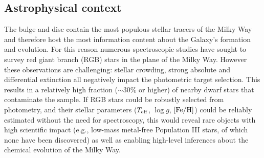 \documentclass[a4paper]{article}
\begin{document}
%
%
\begin{ObservingProgram}
%
%
%
%
%
%
%
\subsection*{Astrophysical context}

The bulge and disc contain the most populous stellar tracers of the Milky Way and therefore host the most information content about the Galaxy's formation and evolution.  For this reason numerous spectroscopic studies have sought to survey red giant branch (RGB) stars in the plane of the Milky Way.  However these observations are challenging: stellar crowding, strong absolute and differential extinction all negatively impact the photometric target selection.  This results in a relatively high fraction ($\sim$30\% or higher) of nearby dwarf stars that contaminate the sample.  If RGB stars could be robustly selected from photometry, and their stellar parameters ($T_{\rm eff}$, $\log{g}$, ${\rm [Fe/H]}$) could be reliably estimated without the need for spectroscopy, this would reveal rare objects with high scientific impact (e.g., low-mass metal-free Population III stars, of which none have been discovered) as well as enabling high-level inferences about the chemical evolution of the Milky Way.



\end{ObservingProgram}
\end{document}
